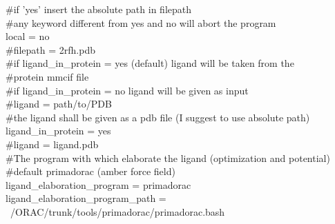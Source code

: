 {					\#if 'yes' insert the absolute path in filepath\\
					\#any keyword different from yes and no will abort the program\\
					$\ $\\
					local = no\\
					\#filepath = 2rfh.pdb\\
					$\ $\\
					\#if ligand\_in\_protein = yes (default) ligand will be taken from the\\
					\#protein mmcif file\\
					$\ $\\
					\#if ligand\_in\_protein = no ligand will be given as input\\
					\#ligand = path/to/PDB\\
					\#the ligand shall be given as a pdb file (I suggest to use absolute path)\\
					$\ $\\
					ligand\_in\_protein = yes\\
					\#ligand = ligand.pdb\\
					$\ $\\
					\#The program with which elaborate the ligand (optimization and potential)\\
					\#default primadorac (amber force field)\\
					$\ $\\
					ligand\_elaboration\_program = primadorac\\
					ligand\_elaboration\_program\_path = ~/ORAC/trunk/tools/primadorac/primadorac.bash\\
					
}

